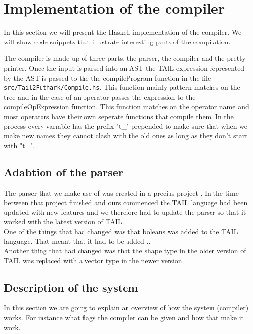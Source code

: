 \documentclass[11pt]{article}
\begin{document}
\section{Implementation of the compiler}
In this section we will present the Haskell implementation of the compiler. We will show code snippets that illustrate interesting parts of the compilation.

The compiler is made up of three parts, the parser, the compiler and the pretty-printer. Once the input is parsed into an AST the
TAIL expression represented by the AST is passed to the the compileProgram function in the file {\tt src/Tail2Futhark/Compile.hs}.
This function mainly pattern-matches on the tree and in the case of an operator passes the expression to the compileOpExpression
function.
This function matches on the operator name and most operators have their own seperate functions that compile them.
In the process every variable has the prefix "t\_" prepended to make sure that when we make new names they cannot clash
with the old ones as long as they don't start with "t\_".

\subsection{Adabtion of the parser}
The parser that we make use of was created in a precius project \cite{APLACC}. In the time between that project finished and ours commenced the TAIL language had been updated with new features and we therefore had to update the parser so that it worked with the latest version of TAIL.\\

One of the things that had changed was that boleans was added to the TAIL language. That meant that it had to be added ..\\

Another thing that had changed was that the shape type in the older version of TAIL was replaced with a vector type in the newer version.\\

\subsection{Description of the system}
In this section we are going to explain an overview of how the system (compiler) works. For instance what flags the compiler can be given and how that make it work. 

\end{document}
